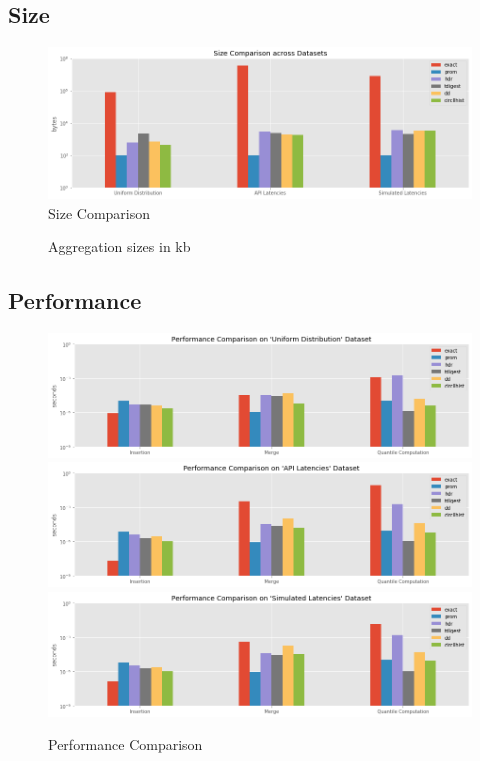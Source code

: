 \documentclass{article}
\theoremstyle{plain}
\theoremstyle{remark}
\begin{document}
{\clearpage
\subsection{Size}

\begin{figure}[t!]
  \includegraphics[width=\textwidth]{evaluation/images/all_size.png}
  \caption{Size Comparison}
\end{figure}

\begin{figure}
  \centering
  
  \caption{Aggregation sizes in kb}
\end{figure}

\clearpage
\subsection{Performance}

\begin{figure}
  \includegraphics[width=\textwidth]{evaluation/images/Uniform_Distribution_perf.png}
  \includegraphics[width=\textwidth]{evaluation/images/API_Latencies_perf.png}
  \includegraphics[width=\textwidth]{evaluation/images/Simulated_Latencies_perf.png}
  \caption{Performance Comparison}
\end{figure}

}
\end{document}
